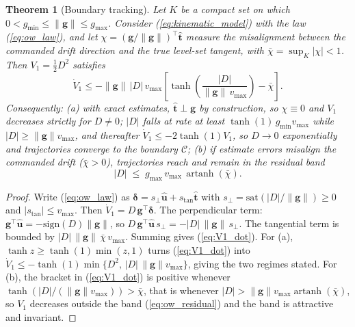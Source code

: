 \documentclass[12pt, letterpaper, oneside]{report}
\newtheorem{theorem}{Theorem}[chapter]
\begin{document}
\begin{theorem}[Boundary tracking]
\label{thm:ow}
Let $K$ be a compact set on which $0 < g_{\min} \leq \|\mathbf{g}\| \leq
g_{\max}$. Consider (\ref{eq:kinematic_model}) with the law
(\ref{eq:ow_law}), and let $\chi = (\mathbf{g}/\|\mathbf{g}\|)^\top
\hat{\mathbf{t}}$ measure the misalignment between the commanded drift
direction and the true level-set tangent, with $\bar{\chi} = \sup_K
|\chi| < 1$. Then $V_1 = \tfrac{1}{2}D^2$ satisfies
\begin{equation}
    \dot{V}_1 \leq -\|\mathbf{g}\|\,|D|\,v_{\max}\left[
    \tanh\!\left(\frac{|D|}{\|\mathbf{g}\|\,v_{\max}}\right)
    - \bar{\chi}\right].
    \label{eq:V1_dot}
\end{equation}
Consequently:
(a) with exact estimates, $\hat{\mathbf{t}} \perp \mathbf{g}$ by
construction, so $\chi \equiv 0$ and $V_1$ decreases strictly for
$D \neq 0$; $|D|$ falls at rate at least $\tanh(1)\,g_{\min} v_{\max}$
while $|D| \geq \|\mathbf{g}\| v_{\max}$, and thereafter $\dot{V}_1
\leq -2\tanh(1)V_1$, so $D \to 0$ exponentially and trajectories
converge to the boundary $\mathcal{C}$;
(b) if estimate errors misalign the commanded drift ($\bar{\chi} > 0$),
trajectories reach and remain in the residual band
\begin{equation}
    |D| \;\leq\; g_{\max}\, v_{\max}\,
    \operatorname{artanh}(\bar{\chi}).
    \label{eq:ow_residual}
\end{equation}
\end{theorem}

\begin{proof}
Write (\ref{eq:ow_law}) as $\boldsymbol{\delta} = s_\perp
\hat{\mathbf{u}} + s_{\text{tan}} \hat{\mathbf{t}}$ with $s_\perp =
\mathrm{sat}(|D|/\|\mathbf{g}\|) \geq 0$ and $|s_{\text{tan}}| \leq
v_{\max}$. Then $\dot{V}_1 = D\,\mathbf{g}^\top \boldsymbol{\delta}$.
The perpendicular term: $\mathbf{g}^\top \hat{\mathbf{u}} =
-\mathrm{sign}(D)\|\mathbf{g}\|$, so $D\,\mathbf{g}^\top
\hat{\mathbf{u}}\, s_\perp = -|D|\,\|\mathbf{g}\|\, s_\perp$. The
tangential term is bounded by $|D|\,\|\mathbf{g}\|\,\bar{\chi}\,
v_{\max}$. Summing gives (\ref{eq:V1_dot}). For (a), $\tanh z \geq
\tanh(1)\min(z, 1)$ turns (\ref{eq:V1_dot}) into $\dot{V}_1 \leq
-\tanh(1)\min\{D^2,\, |D|\,\|\mathbf{g}\|v_{\max}\}$, giving the two
regimes stated. For (b), the bracket in (\ref{eq:V1_dot}) is positive
whenever $\tanh(|D|/(\|\mathbf{g}\|v_{\max})) > \bar{\chi}$, that is
whenever $|D| > \|\mathbf{g}\|v_{\max}\operatorname{artanh}
(\bar{\chi})$, so $V_1$ decreases outside the band
(\ref{eq:ow_residual}) and the band is attractive and invariant.
\end{proof}
\end{document}
